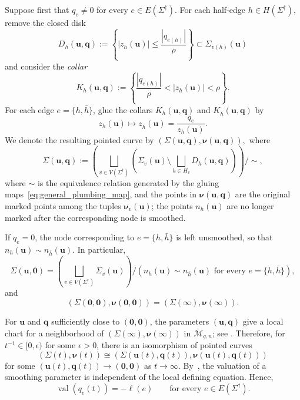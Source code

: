 \documentclass[12pt]{amsart}
\numberwithin{equation}{section}
\theoremstyle{definition}
\def\vertices{V}
\def\edges{E}
\newcommand{\val}{\operatorname{val}}
\def\val{\operatorname{val}}
\def\trop{\dagger}
\def\spectralcurve{\Sigma}
\def\mcurve{\Sigma}
\def\tropmcurve{\mcurve^\trop}
\begin{document}
Suppose first that $q_e\neq0$ for every
$e\in\edges(\tropmcurve)$. For each half-edge
$h\in H(\tropmcurve)$, remove the closed disk
\begin{equation}
\label{eq:general_plumbing_disk}
D_h(\bm u,\bm q)
:=
\left\{
|z_h(\bm u)|
\leq
\frac{|q_{e(h)}|}{\rho}
\right\}
\subset
\mcurve_{v(h)}(\bm u)
\end{equation}
and consider the \emph{collar}
\[
K_h(\bm u,\bm q)
:=
\left\{
\frac{|q_{e(h)}|}{\rho}
<
|z_h(\bm u)|
<
\rho
\right\}.
\]
For each edge $e=\{h,\bar h\}$, glue the collars
$K_h(\bm u,\bm q)$ and $K_{\bar h}(\bm u,\bm q)$ by
\begin{equation}
\label{eq:general_plumbing_map}
z_h(\bm u)
\mapsto
z_{\bar h}(\bm u)
=
\frac{q_e}{z_h(\bm u)}.
\end{equation}
We denote the resulting pointed curve by
$
(\mcurve(\bm u,\bm q),\bm\nu(\bm u,\bm q)),
$
where 
\[
\mcurve(\bm u,\bm q)
:=
\left(
\bigsqcup_{v\in\vertices(\tropmcurve)}
\left(
\mcurve_v(\bm u)
\setminus
\bigsqcup_{h\in H_v}D_h(\bm u,\bm q)
\right)
\right)
\bigg/
\sim,
\]
where $\sim$ is the equivalence relation generated by the gluing
maps~\eqref{eq:general_plumbing_map}, and the points in $\bm\nu(\bm u,\bm q)$ are the original marked points
among the tuples $\bm\nu_v(\bm u)$; the points $n_h(\bm u)$ are no
longer marked after the corresponding node is smoothed. 



If $q_e=0$, the node corresponding to $e=\{h,\bar h\}$ is left
unsmoothed, so that
$
n_h(\bm u)\sim n_{\bar h}(\bm u).
$
In particular,
\[
\mcurve(\bm u,\bm 0)
=
\left(
\bigsqcup_{v\in\vertices(\tropmcurve)}
\mcurve_v(\bm u)
\right)
\bigg/
\left(
n_h(\bm u)\sim n_{\bar h}(\bm u)
\text{ for every }
e=\{h,\bar h\}
\right),
\]
and
\[
(\mcurve(\bm 0,\bm 0),
\bm\nu(\bm 0,\bm 0))
=
(\mcurve(\infty),\bm\nu(\infty)).
\]

For $\bm u$ and $\bm q$ sufficiently close to
$(\bm 0,\bm 0)$, the parameters $(\bm u,\bm q)$ give a local
chart for a neighborhood of
$(\mcurve(\infty),\bm\nu(\infty))$ in
$\overline{\mathcal M}_{g,n}$; see
\cite[Sections~8--10]{HubbardKoch}. Therefore, for \(t^{-1} \in [0,\epsilon)\) for some $\epsilon >0$, there is an
isomorphism of pointed curves
\[
(\spectralcurve(t),\bm\nu(t))
\cong 
(
\mcurve(\bm u(t),\bm q(t)),
\bm\nu(\bm u(t),\bm q(t))
)
\]
for some $(\bm u(t), \bm q(t)) \to (\bm 0,\bm 0)$ as $t \to \infty$. By~\cite[Definition~1.1.1 and the paragraph following it]{ACS}, the valuation of a smoothing parameter is independent of the local defining equation. Hence,
\[
\val(q_e(t))=-\ell(e)
\qquad
\text{for every }e\in\edges(\tropmcurve).
\]
\end{document}
